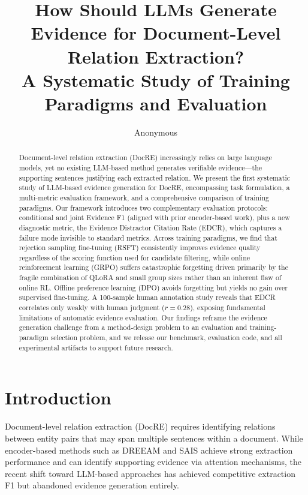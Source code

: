 \documentclass[11pt,a4paper]{article}
\title{How Should LLMs Generate Evidence for Document-Level Relation Extraction?\\A Systematic Study of Training Paradigms and Evaluation}
\author{Anonymous}
\newcommand{\edcr}{\textsc{EDCR}}
\begin{document}
\maketitle

\begin{abstract}
Document-level relation extraction (DocRE) increasingly relies on large language models, yet no existing LLM-based method generates verifiable evidence---the supporting sentences justifying each extracted relation. We present the first systematic study of LLM-based evidence generation for DocRE, encompassing task formulation, a multi-metric evaluation framework, and a comprehensive comparison of training paradigms. Our framework introduces two complementary evaluation protocols: conditional and joint Evidence F1 (aligned with prior encoder-based work), plus a new diagnostic metric, the Evidence Distractor Citation Rate (\edcr{}), which captures a failure mode invisible to standard metrics. Across training paradigms, we find that rejection sampling fine-tuning (RSFT) consistently improves evidence quality regardless of the scoring function used for candidate filtering, while online reinforcement learning (GRPO) suffers catastrophic forgetting driven primarily by the fragile combination of QLoRA and small group sizes rather than an inherent flaw of online RL. Offline preference learning (DPO) avoids forgetting but yields no gain over supervised fine-tuning. A 100-sample human annotation study reveals that \edcr{} correlates only weakly with human judgment ($r{=}0.28$), exposing fundamental limitations of automatic evidence evaluation. Our findings reframe the evidence generation challenge from a method-design problem to an evaluation and training-paradigm selection problem, and we release our benchmark, evaluation code, and all experimental artifacts to support future research.
\end{abstract}

\section{Introduction}

Document-level relation extraction (DocRE) requires identifying relations between entity pairs that may span multiple sentences within a document. While encoder-based methods such as DREEAM \cite{ma2023dreeam} and SAIS \cite{xie2022eider} achieve strong extraction performance and can identify supporting evidence via attention mechanisms, the recent shift toward LLM-based approaches \cite{wadhwa2023revisiting,xu2024lmrc} has achieved competitive extraction F1 but abandoned evidence generation entirely.
\end{document}
